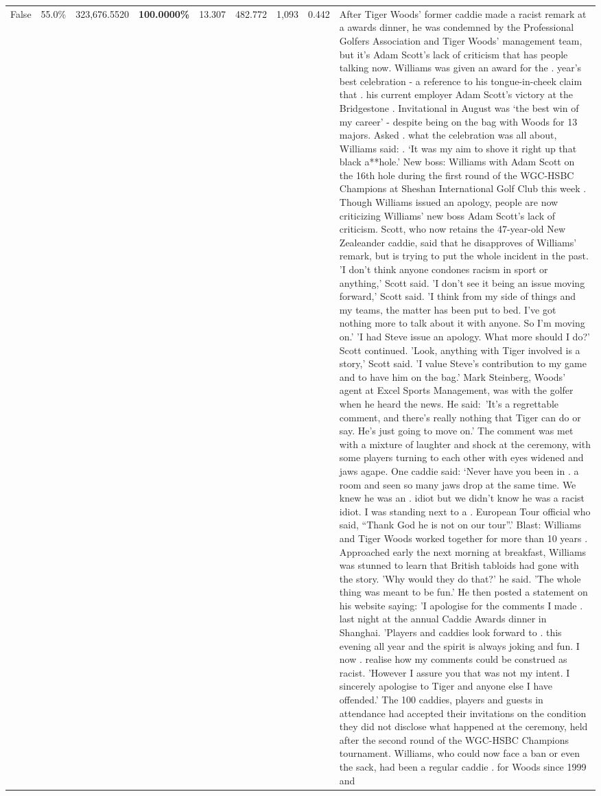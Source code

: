 \begin{table}[H]
\begin{tabular}{lllrlllll}
False & 55.0\% & 323,676.5520 & \bfseries \color{red} 100.0000\% & 13.307 & 482.772 & 1,093 & 0.442 & After Tiger Woods' former caddie made a racist remark at a awards dinner, he was condemned by the Professional Golfers Association and Tiger Woods' management team, but it's Adam Scott's lack of criticism that has people talking now. Williams was given an award for the . year’s best celebration - a reference to his tongue-in-cheek claim that . his current employer Adam Scott’s victory at the Bridgestone . Invitational in August was ‘the best win of my career’ - despite being on the bag with Woods for 13 majors. Asked . what the celebration was all about, Williams said: . ‘It was my aim to shove it right up that black a**hole.’ New boss: Williams with Adam Scott  on the 16th hole during the first round of the WGC-HSBC Champions at Sheshan International Golf Club this week . Though Williams issued an apology, people are now criticizing Williams' new boss Adam Scott's lack of criticism. Scott, who now retains the 47-year-old New Zealeander caddie, said that he disapproves of Williams' remark, but is trying to put the whole incident in the past. 'I don't think anyone condones racism in sport or anything,' Scott said. 'I don't see it being an issue moving forward,' Scott said. 'I think from my side of things and my teams, the matter has been put to bed. I've got nothing more to talk about it with anyone. So I'm moving on.' 'I had Steve issue an apology. What more should I do?' Scott continued. 'Look, anything with Tiger involved is a story,' Scott said. 'I value Steve's contribution to my game and to have him on the bag.' Mark Steinberg, Woods' agent at Excel Sports Management, was with the golfer when he heard the news. He said: 'It's a regrettable comment, and there's really nothing that Tiger can do or say. He's just going to move on.' The comment was met with a mixture of laughter and shock at the ceremony, with some players turning to each other with eyes widened and jaws agape. One caddie said: ‘Never have you been in . a room and seen so many jaws drop at the same time. We knew he was an . idiot but we didn’t know he was a racist idiot. I was standing next to a . European Tour official who said, “Thank God he is not on our tour”.’ Blast: Williams and Tiger Woods worked together for more than 10 years . Approached early the next morning at breakfast, Williams was stunned to learn that British tabloids had gone with the story. 'Why would they do that?' he said. 'The whole thing was meant to be fun.' He then posted a statement on his website saying: 'I apologise for the comments I made . last night at the annual Caddie Awards dinner in Shanghai. 'Players and caddies look forward to . this evening all year and the spirit is always joking and fun. I now . realise how my comments could be construed as racist. 'However I assure you that was not my intent. I sincerely apologise to Tiger and anyone else I have offended.' The 100 caddies, players and guests in attendance had accepted their invitations on the condition they did not disclose what happened at the ceremony, held after the second round of the WGC-HSBC Champions tournament. Williams, who could now face a ban or even the sack, had been a regular caddie . for Woods since 1999 and 
\end{tabular}
\end{table}

